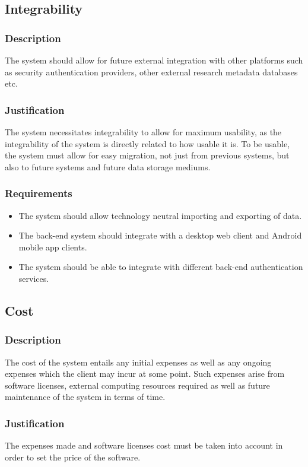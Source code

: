 \documentclass[11pt,fleqn]{book} %
\begin{document}
		\subsection{Integrability}
			\subsubsection{Description}
				The system should allow for future external integration with other platforms such as security authentication providers, other external research metadata databases etc.
			\subsubsection{Justification}
				The system necessitates integrability to allow for maximum usability, as the integrability of the system is directly related to how usable it is. To be usable, the system must allow for easy migration, not just from previous systems, but also to future systems and future data storage mediums.
			\subsubsection{Requirements}
				\begin{itemize}
					\item The system should allow technology neutral importing and exporting of data.
					\item The back-end system should integrate with a desktop web client and Android mobile app clients.
					\item The system should be able to integrate with different back-end authentication services.
				\end{itemize}
		\subsection{Cost}
			\subsubsection{Description}
				The cost of the system entails any initial expenses as well as any ongoing expenses which the client may incur at some point. Such expenses arise from software licenses, external computing resources required as well as future maintenance of the system in terms of time.
			\subsubsection{Justification}
				The expenses made and software licenses cost must be taken into account in order to set the price of the software.
\end{document}
